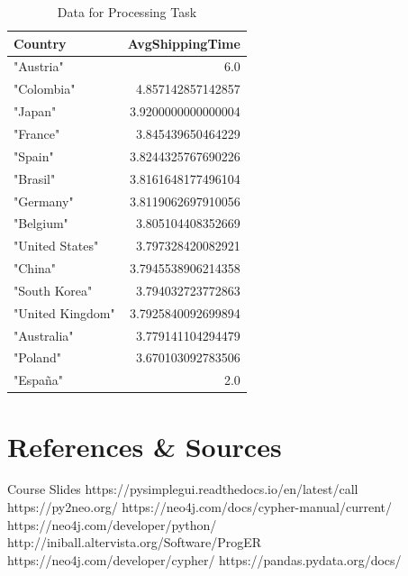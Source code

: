 \documentclass[a4paper,12pt]{article}
\begin{document}
\begin{table}[h!]
  \centering
  \caption{Data for Processing Task}
  \label{tab:processing_data}
  \begin{tabular}{l r}
      \toprule
      \textbf{Country} & \textbf{AvgShippingTime} \\
      \midrule
      "Austria" &	6.0\\
      "Colombia" & 4.857142857142857 \\
      "Japan" & 3.9200000000000004 \\
      "France" & 3.845439650464229 \\
      "Spain" & 3.8244325767690226 \\
      "Brasil" & 3.8161648177496104 \\
      "Germany" & 3.8119062697910056 \\
      "Belgium" & 3.805104408352669 \\
      "United States" & 3.797328420082921 \\
      "China" & 3.7945538906214358 \\
      "South Korea" & 3.794032723772863 \\
      "United Kingdom" & 3.7925840092699894 \\
      "Australia" & 3.779141104294479 \\
      "Poland" & 3.670103092783506 \\
      "España" & 2.0 \\
      \bottomrule
  \end{tabular}
\end{table}




\newpage
\section{References \& Sources}
  \begin{thebibliography}{9}
    \bibitem{} Course Slides
    \bibitem{} https://pysimplegui.readthedocs.io/en/latest/call%
    \bibitem{} https://py2neo.org/
    \bibitem{} https://neo4j.com/docs/cypher-manual/current/
    \bibitem{} https://neo4j.com/developer/python/
    \bibitem{} http://iniball.altervista.org/Software/ProgER
    \bibitem{} https://neo4j.com/developer/cypher/
    \bibitem{} https://pandas.pydata.org/docs/
  \end{thebibliography}
\end{document}
